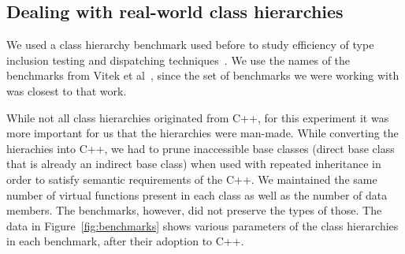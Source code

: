 
\subsection{Dealing with real-world class hierarchies}
\label{sec:hierarchies}

We used a class hierarchy benchmark used before to study efficiency of type 
inclusion testing and dispatching techniques~\cite{Vitek97,Krall97nearoptimal,PQEncoding,Ducournau08}. 
We use the names of the benchmarks from Vitek et al~\cite[Table 2]{Vitek97}, 
since the set of benchmarks we were working with was closest to that work.

While not all class hierarchies originated from C++, for this experiment it 
was more important for us that the hierarchies were man-made. While converting 
the hierachies into C++, we had to prune inaccessible base classes (direct base  
class that is already an indirect base class) when used with repeated 
inheritance in order to satisfy semantic requirements of the C++. We maintained 
the same number of virtual functions present in each class as well as the number 
of data members. The benchmarks, however, did not preserve the types of those.
The data in Figure~\ref{fig:benchmarks} shows various parameters of the class 
hierarchies in each benchmark, after their adoption to C++. 

